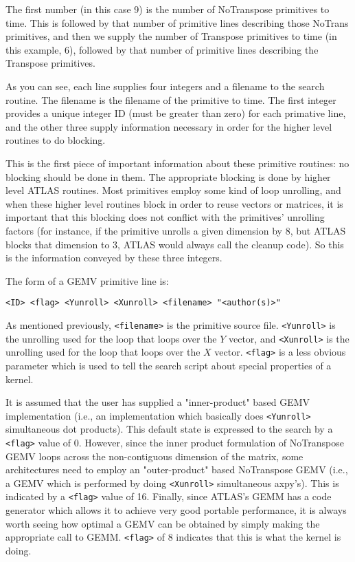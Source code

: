 \documentclass[11pt]{article}
\begin{document}
{The first number (in this case 9) is the number of NoTranspose primitives
to time.  This is followed by that number of primitive lines describing those
NoTrans primitives, and then we supply the number of Transpose primitives to
time (in this example, 6), followed by that number of primitive lines
describing the Transpose primitives.

As you can see, each line supplies four integers and a filename to the
search routine.  The filename is the filename of the primitive to time.
The first integer provides a unique integer ID (must be greater than zero)
for each primative line, and the other
three supply information necessary in order for the higher
level routines to do blocking.

This is the first piece of important information about these primitive
routines: no blocking should be done in them.  The appropriate blocking
is done by higher level ATLAS routines.  Most primitives
employ some kind of loop unrolling, and when these higher level routines
block in order to reuse vectors or matrices, it is important that this
blocking does not conflict with the primitives' unrolling factors (for instance,
if the primitive unrolls a given dimension by 8, but ATLAS blocks that
dimension to 3, ATLAS would always call the cleanup code).  So this is the
information conveyed by these three integers.

The form of a GEMV primitive line is:
\begin{verbatim}
<ID> <flag> <Yunroll> <Xunroll> <filename> "<author(s)>"
\end{verbatim}

As mentioned previously, \verb+<filename>+ is the primitive source file.  
\verb+<Yunroll>+
is the unrolling used for the loop that loops over the $Y$ vector, and
\verb+<Xunroll>+ is the unrolling used for the loop that loops over the
$X$ vector.  \verb+<flag>+ is a less obvious parameter which is used
to tell the search script about special properties of a kernel.

It is assumed that the user has supplied a "inner-product" based GEMV
implementation (i.e., an implementation which basically does \verb+<Yunroll>+
simultaneous dot products).  This default state is expressed to the search
by a \verb+<flag>+ value of 0.  However, since the inner product formulation of
NoTranspose GEMV loops across the non-contiguous dimension of the matrix,
some architectures need to employ an "outer-product" based NoTranspose GEMV
(i.e., a GEMV which is performed by doing \verb+<Xunroll>+ simultaneous axpy's).
This is indicated by a \verb+<flag>+ value of 16.  Finally, since ATLAS's
GEMM has
a code generator which allows it to achieve very good portable performance,
it is always worth seeing how optimal a GEMV can be obtained by simply
making the appropriate call to GEMM.  \verb+<flag>+ of 8 indicates
that this is what the kernel is doing.

}
\end{document}
